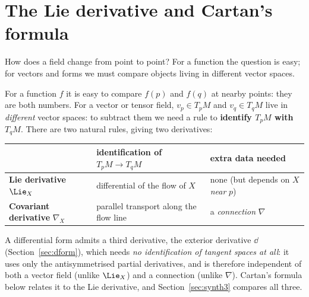 \section{The Lie derivative and Cartan's formula}\label{sec:lie}

How does a field change from point to point? For a function the question is easy; for vectors and forms we must compare objects living in different
vector spaces.
\begin{intuition}
For a function $f$ it is easy to compare $f(p)$ and $f(q)$ at nearby points: they are both numbers. For a vector or tensor field, $v_p\in T_pM$ and $v_q\in T_qM$ live in \emph{different} vector spaces: to subtract them we need a rule to \textbf{identify $T_pM$ with $T_qM$}. There are two natural rules, giving two derivatives:
\begin{center}
\begin{tabular}{@{}p{3.6cm}p{5.6cm}p{5.2cm}@{}}
\toprule
 & identification of $T_pM\to T_{q}M$ & extra data needed\\ \midrule
\textbf{Lie derivative} $\Lie_X$ & differential of the flow of $X$ & none (but depends on $X$ \emph{near} $p$)\\
\textbf{Covariant derivative} $\nabla_X$ & parallel transport along the flow line & a \emph{connection} $\nabla$\\ \bottomrule
\end{tabular}
\end{center}
\end{intuition}


\begin{remark}
A differential form admits a third derivative, the exterior derivative $\dd$ (Section~\ref{sec:dform}), which needs \emph{no identification of tangent spaces at all}: it
uses only the antisymmetrised partial derivatives, and is therefore independent of both a vector field (unlike $\Lie_X$) and a connection (unlike $\nabla$).
Cartan's formula below relates it to the Lie derivative, and Section~\ref{sec:synth3} compares all three.
\end{remark}





